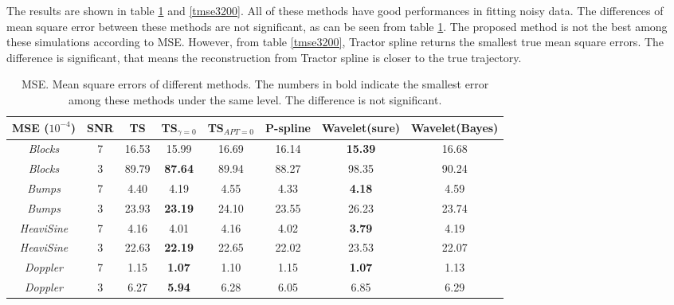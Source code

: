 The results are shown in table \ref{mse3200} and \ref{tmse3200}. All of these methods have good performances in fitting noisy data. The differences of mean square error between these methods are not significant, as can be seen from table \ref{mse3200}. The proposed method is not the best among these simulations according to MSE. However, from table \ref{tmse3200}, Tractor spline returns the smallest true mean square errors. The difference is significant, that means the reconstruction from Tractor spline is closer to the true trajectory. 
 
 \begin{table}
 	\centering
 	\caption{MSE. Mean square errors of different methods. The numbers in bold indicate the smallest error among these methods under the same level. The difference is not significant.}\label{mse3200}
	\setlength\tabcolsep{1.5pt}
	\begin{tabular}{|c|c|c|c|c|c|c|c|}
\hline	MSE ($10^{-4}$)   & SNR & TS & TS$_{\gamma=0}$ & TS$_{APT=0}$  & P-spline & Wavelet(sure)& Wavelet(Bayes)\\ \hline
\textit{Blocks}    & 7   &  16.53& 15.99 & 16.69 & 16.14  & \textbf{15.39} & 16.68 \\ \hline
\textit{Blocks}    & 3   &  89.79 & \textbf{87.64} & 89.94  & 88.27 & 98.35 & 90.24 \\ \hline
\textit{Bumps}     & 7   & 4.40 & 4.19 & 4.55 & 4.33 & \textbf{4.18} & 4.59 \\ \hline
\textit{Bumps}     & 3   & 23.93 & \textbf{23.19} & 24.10 & 23.55 & 26.23 & 23.74 \\ \hline
\textit{HeaviSine} & 7   & 4.16 & 4.01 &4.16 & 4.02 & \textbf{3.79} & 4.19 \\ \hline
\textit{HeaviSine} & 3   & 22.63 & \textbf{22.19} & 22.65 & 22.02 & 23.53 & 22.07 \\ \hline
\textit{Doppler}   & 7   & 1.15 & \textbf{1.07} & 1.10 & 1.15  & \textbf{1.07} & 1.13  \\ \hline
\textit{Doppler}   & 3   & 6.27 & \textbf{5.94} &6.28 & 6.05  & 6.85 & 6.29  \\ \hline
	\end{tabular}
\end{table}

